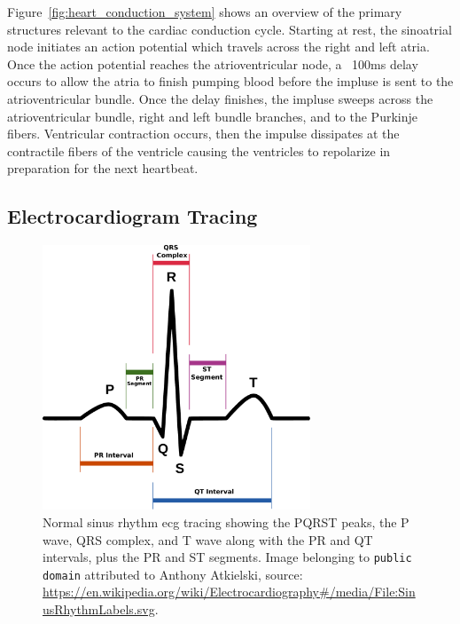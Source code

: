 \documentclass[\main/thesis.tex]{subfiles}
\begin{document}
Figure~\ref{fig:heart_conduction_system} shows an overview of the primary structures relevant to the cardiac conduction cycle.
Starting at rest, the sinoatrial node initiates an action potential which travels across the right and left atria.
Once the action potential reaches the atrioventricular node, a ~100ms delay occurs to allow the atria to finish pumping blood before the impluse is sent to the atrioventricular bundle.
Once the delay finishes, the impluse sweeps across the atrioventricular bundle, right and left bundle branches, and to the Purkinje fibers.
Ventricular contraction occurs, then the impulse dissipates at the contractile fibers of the ventricle causing the ventricles to repolarize in preparation for the next heartbeat.

\subsection{Electrocardiogram Tracing}

\begin{figure}[ht]
    \centering
    \includegraphics[width=8cm]{figure/PQRST_NormalSinusRhythm.pdf}
    \caption[Normal sinus rhythm \gls{ecg} tracing with PQRST peaks annotated.]{Normal sinus rhythm \gls{ecg} tracing showing the PQRST peaks, the P wave, QRS complex, and T wave along with the PR and QT intervals, plus the PR and ST segments.
    Image belonging to \texttt{public domain} attributed to Anthony Atkielski, source: \url{https://en.wikipedia.org/wiki/Electrocardiography\#/media/File:SinusRhythmLabels.svg}.
    }
    \label{fig:pqrst_nsr}
\end{figure}
\end{document}
